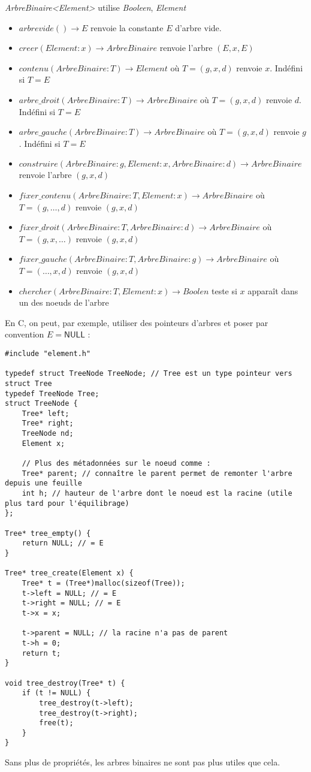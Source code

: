 \documentclass[../../../main.tex]{subfiles}
\begin{document}
\textit{ArbreBinaire\textless{}Element\textgreater} utilise \textit{Booleen}, \textit{Element}
\begin{itemize}
	\item $arbrevide()\rightarrow E$ renvoie la constante $E$ d'arbre vide.
	\item $creer(Element:x) \rightarrow ArbreBinaire$ renvoie l'arbre $(E, x, E)$
	\item $contenu(ArbreBinaire:T)\rightarrow Element$ où $T = (g, x, d)$ renvoie $x$. Indéfini si $T = E$
	\item $arbre\_droit(ArbreBinaire:T)\rightarrow ArbreBinaire$ où $T = (g, x, d)$ renvoie $d$. Indéfini si $T = E$
	\item $arbre\_gauche(ArbreBinaire:T)\rightarrow ArbreBinaire$ où $T = (g, x, d)$ renvoie $g$. Indéfini si $T = E$
	\item $construire(ArbreBinaire:g, Element:x, ArbreBinaire:d)\rightarrow ArbreBinaire$ renvoie l'arbre $(g, x, d)$
	\item $fixer\_contenu(ArbreBinaire:T, Element:x)\rightarrow ArbreBinaire$ où $T = (g, \dots, d)$ renvoie $(g, x, d)$
	\item $fixer\_droit(ArbreBinaire:T, ArbreBinaire:d)\rightarrow ArbreBinaire$ où $T = (g, x, \dots)$ renvoie $(g, x, d)$
	\item $fixer\_gauche(ArbreBinaire:T, ArbreBinaire:g)\rightarrow ArbreBinaire$ où $T = (\dots, x, d)$ renvoie $(g, x, d)$
	\item $chercher(ArbreBinaire:T, Element:x)\rightarrow Boolen$ teste si $x$ apparaît dans un des noeuds de l'arbre
\end{itemize}
En C, on peut, par exemple, utiliser des pointeurs d'arbres et poser par convention $E = \textsf{NULL}$ :
\begin{verbatim}
#include "element.h"

typedef struct TreeNode TreeNode; // Tree est un type pointeur vers struct Tree
typedef TreeNode Tree;
struct TreeNode {
	Tree* left;
	Tree* right;
	TreeNode nd;
	Element x;

	// Plus des métadonnées sur le noeud comme :
	Tree* parent; // connaître le parent permet de remonter l'arbre depuis une feuille
	int h; // hauteur de l'arbre dont le noeud est la racine (utile plus tard pour l'équilibrage)
};

Tree* tree_empty() {
	return NULL; // = E
}

Tree* tree_create(Element x) {
	Tree* t = (Tree*)malloc(sizeof(Tree));
	t->left = NULL; // = E
	t->right = NULL; // = E
	t->x = x;

	t->parent = NULL; // la racine n'a pas de parent
	t->h = 0;
	return t;
}

void tree_destroy(Tree* t) {
	if (t != NULL) {
		tree_destroy(t->left);
		tree_destroy(t->right);
		free(t);
	}
}
\end{verbatim}
Sans plus de propriétés, les arbres binaires ne sont pas plus utiles que cela.
\end{document}
